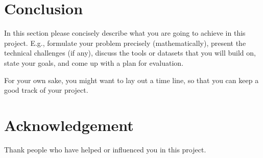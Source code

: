 \documentclass{article}
\begin{document}
\section{Conclusion}
In this section please concisely describe what you are going to achieve in this project. E.g., formulate your problem precisely (mathematically), present the technical challenges (if any), discuss the tools or datasets that you will build on, state your goals, and come up with a plan for evaluation.

For your own sake, you might want to lay out a time line, so that you can keep a good track of your project.

\newpage

\section*{Acknowledgement}
Thank people who have helped or influenced you in this project.

\nocite{*}



\end{document}
